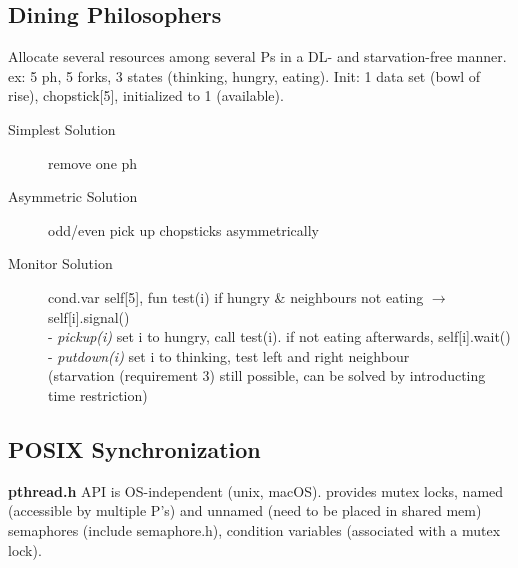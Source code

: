 \subsection*{Dining Philosophers}
Allocate several resources among several Ps in a DL- and starvation-free manner. ex: 5 ph, 5 forks, 3 states (thinking, hungry, eating). Init: 1 data set (bowl of rise), chopstick[5], initialized to 1 (available).
\begin{description}
    \item[Simplest Solution] remove one ph %
    \item[Asymmetric Solution] odd/even pick up chopsticks asymmetrically
    \item[Monitor Solution]cond.var self[5], fun test(i) if hungry \& neighbours not eating $\rightarrow$ self[i].signal() \\
        - \textit{pickup(i)} set i to hungry, call test(i). if not eating afterwards, self[i].wait() \\
        - \textit{putdown(i)} set i to thinking, test left and right neighbour \\
        (starvation (requirement 3) still possible, can be solved by introducting time restriction)
\end{description}

\subsection*{POSIX Synchronization}
    \textbf{pthread.h} API is OS-independent (unix, macOS). provides mutex locks, named (accessible by multiple P's) and unnamed (need to be placed in shared mem) semaphores (include semaphore.h), condition variables (associated with a mutex lock).


